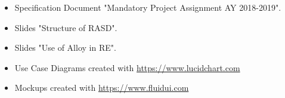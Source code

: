\begin{itemize}

\item Specification Document "Mandatory Project Assignment AY 2018-2019".

\item Slides "Structure of RASD".

\item Slides "Use of Alloy in RE".

\item Use Case Diagrams created with \url{https://www.lucidchart.com}

\item Mockups created with \url{https://www.fluidui.com}

\end{itemize}